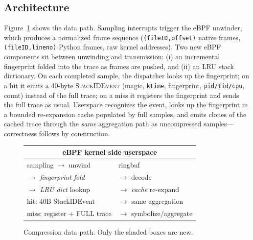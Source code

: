 \documentclass[letterpaper,twocolumn,10pt]{article}
\begin{document}
\subsection{Architecture}
Figure~\ref{fig:arch} shows the data path. Sampling interrupts trigger the
eBPF unwinder, which produces a normalized frame sequence
(\texttt{(fileID,offset)} native frames, \texttt{(fileID,lineno)} Python
frames, raw kernel addresses). Two new eBPF components sit between
unwinding and transmission: (i) an incremental fingerprint folded into the
trace as frames are pushed, and (ii) an LRU stack dictionary. On each
completed sample, the dispatcher looks up the fingerprint; on a hit it
emits a 40-byte \textsc{StackIDEvent} (magic, \texttt{ktime}, fingerprint,
\texttt{pid/tid/cpu}, count) instead of the full trace; on a miss it
registers the fingerprint and sends the full trace as usual. Userspace
recognizes the event, looks up the fingerprint in a bounded re-expansion
cache populated by full samples, and emits clones of the cached trace
through the \emph{same} aggregation path as uncompressed samples---
correctness follows by construction.

\begin{figure}[t]
\centering
\small
\begin{tabular}{@{}p{}p{}@{}}
\multicolumn{2}{c}{\textbf{eBPF kernel side} \hspace{1.2cm} \textbf{userspace}}\\
\hline
sampling $\rightarrow$ unwind & ringbuf \\
$\rightarrow$ \emph{fingerprint fold} & $\rightarrow$ decode \\
$\rightarrow$ \emph{LRU dict} lookup & $\rightarrow$ \emph{cache} re-expand \\
\hspace{3mm}hit: 40B StackIDEvent & $\rightarrow$ same aggregation \\
\hspace{3mm}miss: register + FULL trace & $\rightarrow$ symbolize/aggregate \\
\hline
\end{tabular}
\caption{Compression data path. Only the shaded boxes are new.}
\label{fig:arch}
\end{figure}
\end{document}
